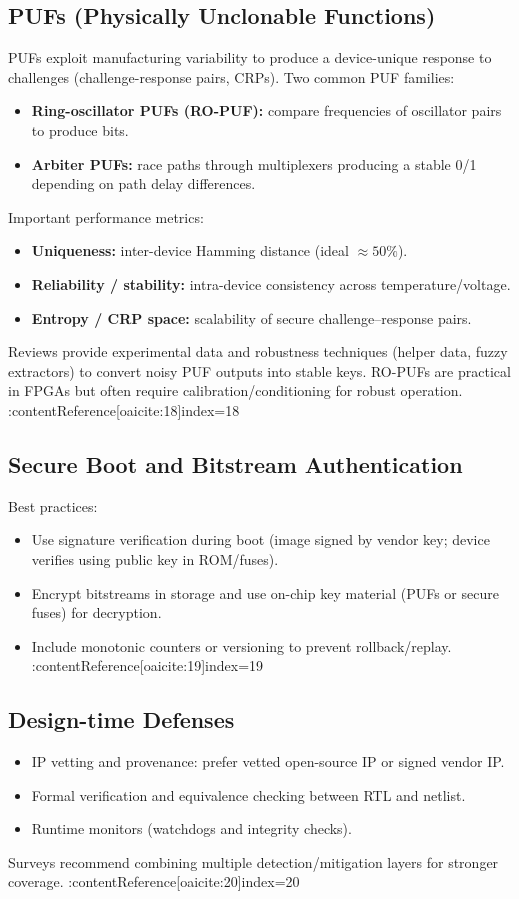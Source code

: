 \documentclass[11pt]{article}
\begin{document}
\subsection{PUFs (Physically Unclonable Functions)}
PUFs exploit manufacturing variability to produce a device-unique response to challenges (challenge-response pairs, CRPs). Two common PUF families:
\begin{itemize}
  \item \textbf{Ring-oscillator PUFs (RO-PUF):} compare frequencies of oscillator pairs to produce bits.
  \item \textbf{Arbiter PUFs:} race paths through multiplexers producing a stable 0/1 depending on path delay differences.
\end{itemize}
Important performance metrics:
\begin{itemize}
  \item \textbf{Uniqueness:} inter-device Hamming distance (ideal $\approx 50\%$).
  \item \textbf{Reliability / stability:} intra-device consistency across temperature/voltage.
  \item \textbf{Entropy / CRP space:} scalability of secure challenge–response pairs.
\end{itemize}
Reviews provide experimental data and robustness techniques (helper data, fuzzy extractors) to convert noisy PUF outputs into stable keys. RO-PUFs are practical in FPGAs but often require calibration/conditioning for robust operation. :contentReference[oaicite:18]{index=18}

\subsection{Secure Boot and Bitstream Authentication}
Best practices:
\begin{itemize}
  \item Use signature verification during boot (image signed by vendor key; device verifies using public key in ROM/fuses).
  \item Encrypt bitstreams in storage and use on-chip key material (PUFs or secure fuses) for decryption.
  \item Include monotonic counters or versioning to prevent rollback/replay. :contentReference[oaicite:19]{index=19}
\end{itemize}

\subsection{Design-time Defenses}
\begin{itemize}
  \item IP vetting and provenance: prefer vetted open-source IP or signed vendor IP.
  \item Formal verification and equivalence checking between RTL and netlist.
  \item Runtime monitors (watchdogs and integrity checks).
\end{itemize}
Surveys recommend combining multiple detection/mitigation layers for stronger coverage. :contentReference[oaicite:20]{index=20}
\end{document}
